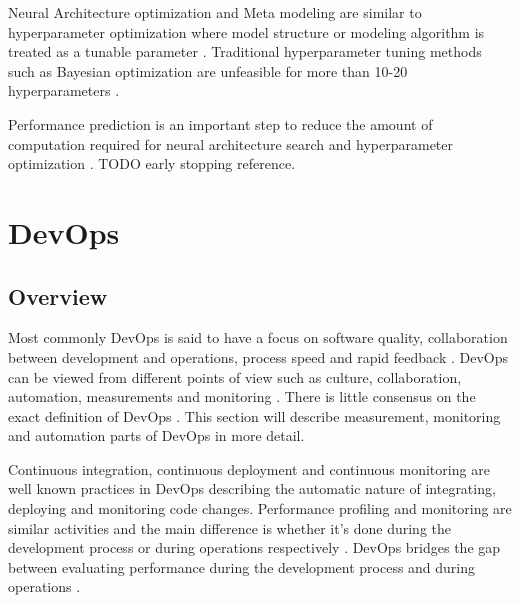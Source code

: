 Neural Architecture optimization and Meta modeling are similar to hyperparameter optimization where model structure or modeling algorithm is treated as a tunable parameter \parencite{bakerAcceleratingNeuralArchitecture2017}. Traditional hyperparameter tuning methods such as Bayesian optimization are unfeasible for more than 10-20 hyperparameters \parencite{maclaurinGradientbasedHyperparameterOptimization2015}.

Performance prediction is an important step to reduce the amount of computation required for neural architecture search and hyperparameter optimization \parencite{bakerAcceleratingNeuralArchitecture2017}. TODO early stopping reference.



\section{DevOps} %
\label{sec:devops}

\subsection{Overview}

Most commonly DevOps is said to have a focus on software quality, collaboration between development and operations, process speed and rapid feedback \parencite{mishraDevOpsSoftwareQuality2020,wallerIncludingPerformanceBenchmarks2015, pereraImproveSoftwareQuality2017}. DevOps can be viewed from different points of view such as culture, collaboration, automation, measurements and monitoring \parencite{mishraDevOpsSoftwareQuality2020, wallerIncludingPerformanceBenchmarks2015}. There is little consensus on the exact definition of DevOps \parencite{smedsDevOpsDefinitionPerceived2015}. This section will describe measurement, monitoring and automation parts of DevOps in more detail.



Continuous integration, continuous deployment and continuous monitoring are well known practices in DevOps \parencite{wallerIncludingPerformanceBenchmarks2015} describing the automatic nature of integrating, deploying and monitoring code changes. Performance profiling and monitoring are similar activities and the main difference is whether it's done during the development process or during operations respectively \parencite{wallerIncludingPerformanceBenchmarks2015}. DevOps bridges the gap between evaluating performance during the development process and during operations \parencite{brunnertPerformanceorientedDevOpsResearch2015}.

